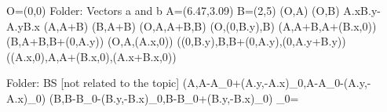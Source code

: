 O=\left(0,0\right)
Folder: Vectors a and b
A=\left(6.47,3.09\right)
B=\left(2,5\right)
\left(O,A\right)
\left(O,B\right)
A.xB.y-A.yB.x
\left(A,A+B\right)
\left(B,A+B\right)
\left(O,A,A+B,B\right)
\left(O,\left(0,B.y\right),B\right)
\left(A,A+B,A+\left(B.x,0\right)\right)
\left(B,A+B,B+\left(0,A.y\right)\right)
\left(O,A,\left(A.x,0\right)\right)
\left(\left(0,B.y\right),B,B+\left(0,A.y\right),\left(0,A.y+B.y\right)\right)
\left(\left(A.x,0\right),A,A+\left(B.x,0\right),\left(A.x+B.x,0\right)\right)

Folder: BS [not related to the topic]
\left(A,A-A\cos\theta_{0}+\left(A.y,-A.x\right)\sin\theta_{0},A-A\cos\theta_{0}-\left(A.y,-A.x\right)\sin\theta_{0}\right)
\left(B,B-B\cos\theta_{0}-\left(B.y,-B.x\right)\sin\theta_{0},B-B\cos\theta_{0}+\left(B.y,-B.x\right)\sin\theta_{0}\right)
\theta_{0}=
